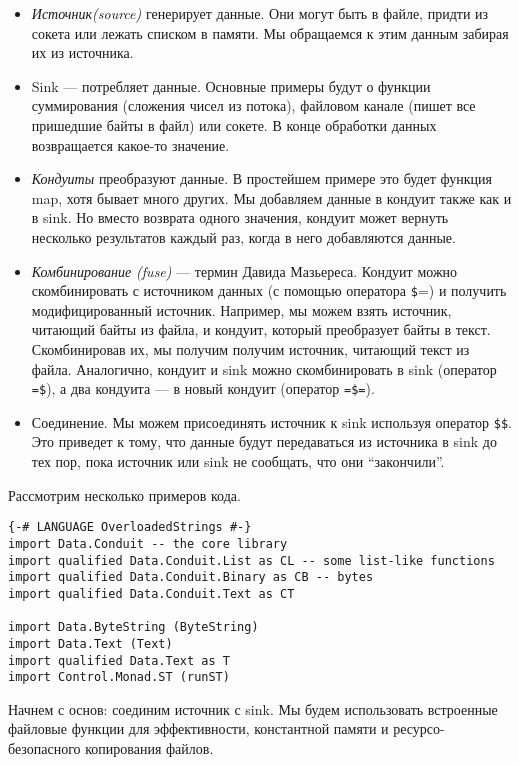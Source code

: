 \begin{itemize}
 \item \textit{Источник(source)} генерирует данные. Они могут быть в файле, придти из
сокета или лежать списком в памяти. Мы обращаемся к этим данным забирая их из источника.
 \item Sink --- потребляет данные. Основные примеры будут о функции суммирования
(сложения чисел из потока), файловом канале (пишет все пришедшие байты в файл) или
сокете. В конце обработки данных возвращается какое-то значение.
 \item \textit{Кондуиты} преобразуют данные. В простейшем примере это будет функция map,
хотя бывает много других. Мы добавляем данные в кондуит также как и в sink. Но вместо
возврата одного значения, кондуит может вернуть несколько результатов каждый раз, когда в
него добавляются данные.
  \item \textit{Комбинирование (fuse)} --- термин Давида Мазьереса. Кондуит можно 
скомбинировать с источником данных (с помощью оператора \verb=$==) и получить
модифицированный источник. Например, мы можем взять источник, читающий байты из файла, и
кондуит, который преобразует байты в текст. Скомбинировав их, мы получим получим
источник, читающий текст из файла. Аналогично, кондуит и sink можно скомбинировать в sink
(оператор \verb#=$#), а два кондуита --- в новый кондуит (оператор \verb#=$=#).
  \item Соединение. Мы можем присоединять источник к sink используя оператор \verb=$$=.
Это приведет к тому, что данные будут передаваться из источника в sink до тех пор, пока
источник или sink не сообщать, что они ``закончили''.
\end{itemize}

Рассмотрим несколько примеров кода.
\begin{verbatim}
{-# LANGUAGE OverloadedStrings #-}
import Data.Conduit -- the core library
import qualified Data.Conduit.List as CL -- some list-like functions
import qualified Data.Conduit.Binary as CB -- bytes
import qualified Data.Conduit.Text as CT

import Data.ByteString (ByteString)
import Data.Text (Text)
import qualified Data.Text as T
import Control.Monad.ST (runST)
\end{verbatim}
Начнем с основ: соединим источник с sink. Мы будем использовать встроенные файловые
функции для эффективности, константной памяти и ресурсо-безопасного копирования файлов.

